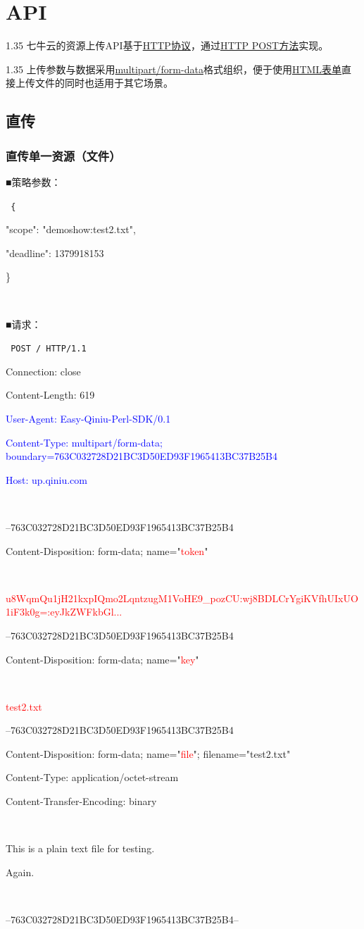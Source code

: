\documentclass[11pt, oneside]{book}
\newcommand{\qpara}[1]{
\vspace{0.2em}
\begin{spacing}{1.35}
\noindent
#1\par
\end{spacing}
\vspace{0.2em}
}
\newcommand{\qblock}[1]{
\vspace{0.1em}
\noindent
#1\par
\vspace{0.1em}
}
\newcommand{\qhttp}[1]{\noindent #1\par}
\begin{document}
\chapter{API}

\qpara{七牛云的资源上传API基于\href{http://en.wikipedia.org/wiki/Hypertext\_Transfer\_Protocol}{HTTP协议}，通过\href{http://en.wikipedia.org/wiki/POST\_(HTTP)}{HTTP POST方法}实现。}
\qpara{上传参数与数据采用\href{http://en.wikipedia.org/wiki/MIME\#Multipart\_messages}{multipart/form-data}格式组织，便于使用\href{http://www.w3.org/TR/html4/interact/forms.html}{HTML表单}直接上传文件的同时也适用于其它场景。}

\section{直传}

\subsection{直传单一资源（文件）}

\qblock{■\thinspace 策略参数：}
{
\tt \footnotesize
\qhttp{\{}
\qhttp{    "scope":    "demoshow:test2.txt",}
\qhttp{    "deadline": 1379918153}
\qhttp{\}}
\qhttp{\ }
}

\qblock{■\thinspace 请求：}
{
\tt \footnotesize
\qhttp{POST / HTTP/1.1}
\qhttp{Connection: close}
\qhttp{Content-Length: 619}
\qhttp{\textcolor{blue}{User-Agent: Easy-Qiniu-Perl-SDK/0.1}}
\qhttp{\textcolor{blue}{Content-Type: multipart/form-data; boundary=763C032728D21BC3D50ED93F1965413BC37B25B4}}
\qhttp{\textcolor{blue}{Host: up.qiniu.com}}
\qhttp{\ }
\qhttp{--763C032728D21BC3D50ED93F1965413BC37B25B4}
\qhttp{Content-Disposition: form-data; name="\textcolor{red}{token}"}
\qhttp{\ }
\qhttp{\textcolor{red}{u8WqmQu1jH21kxpIQmo2LqntzugM1VoHE9\_pozCU:wj8BDLCrYgiKVfhUIxUO1iF3k0g=:eyJkZWFkbGl...}}
\qhttp{--763C032728D21BC3D50ED93F1965413BC37B25B4}
\qhttp{Content-Disposition: form-data; name="\textcolor{red}{key}"}
\qhttp{\ }
\qhttp{\textcolor{red}{test2.txt}}
\qhttp{--763C032728D21BC3D50ED93F1965413BC37B25B4}
\qhttp{Content-Disposition: form-data; name="\textcolor{red}{file}"; filename="test2.txt"}
\qhttp{Content-Type: application/octet-stream}
\qhttp{Content-Transfer-Encoding: binary}
\qhttp{\ }
\qhttp{\textcolor{YellowOrange}{This is a plain text file for testing.}}
\qhttp{\textcolor{YellowOrange}{Again.}}
\qhttp{\ }
\qhttp{--763C032728D21BC3D50ED93F1965413BC37B25B4--}
\qhttp{\ }
}
\end{document}
